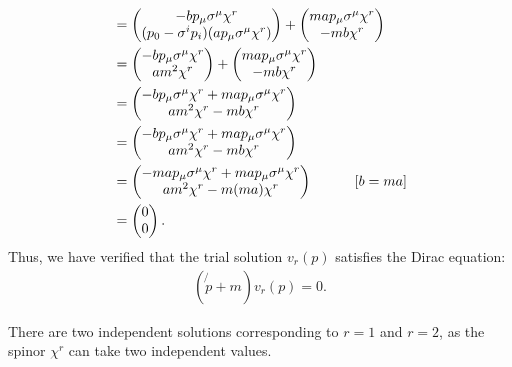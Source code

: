 \begin{enumerate}
\begin{align}
        &=\begin{pmatrix}
        -b p_\mu \sigma^\mu \chi^r \\
        (p_0 - \sigma^i p_i)(a p_\mu \sigma^\mu \chi^r)
        \end{pmatrix}+
        \begin{pmatrix}
        m a p_\mu \sigma^\mu \chi^r \\
        -m b \chi^r
        \end{pmatrix}\notag\\
        &=\begin{pmatrix}
        -b p_\mu \sigma^\mu \chi^r \\
        a m^2 \chi^r
        \end{pmatrix}+
        \begin{pmatrix}
        m a p_\mu \sigma^\mu \chi^r \\
        -m b \chi^r
        \end{pmatrix}\notag\\
        &=\begin{pmatrix}
        -b p_\mu \sigma^\mu \chi^r + m a p_\mu \sigma^\mu \chi^r \\
        a m^2 \chi^r - m b \chi^r
        \end{pmatrix}\notag\\
        &=\begin{pmatrix}
        -b p_\mu \sigma^\mu \chi^r + m a p_\mu \sigma^\mu \chi^r \\
        a m^2 \chi^r - m b \chi^r
        \end{pmatrix}\notag\\
        &=
        \begin{pmatrix}
        -ma p_\mu \sigma^\mu \chi^r + m a p_\mu \sigma^\mu \chi^r \\
        a m^2 \chi^r - m (ma) \chi^r
        \end{pmatrix}\qquad~~~[b=ma]\notag\\
        &=
        \begin{pmatrix}
        0 \\
        0
        \end{pmatrix}.
    \end{align}
    Thus, we have verified that the trial solution $v_r(p)$ satisfies the Dirac equation:
    \begin{align*}
        (\not{p} + m)v_r(p) = 0.
    \end{align*}
    
    There are two independent solutions corresponding to $r = 1$ and $r = 2$, as the spinor $\chi^r$ can take two independent values.
\end{enumerate}